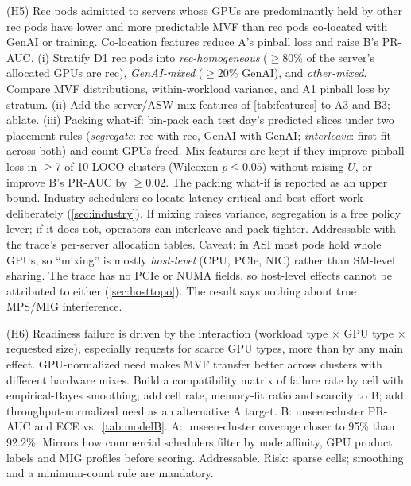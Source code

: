 {(H5) Rec pods admitted to servers whose GPUs are predominantly held by other rec pods have lower and more predictable MVF than rec pods co-located with GenAI or training. Co-location features reduce A's pinball loss and raise B's PR-AUC.}
{(i) Stratify D1 rec pods into \emph{rec-homogeneous} ($\ge$80\% of the server's allocated GPUs are rec), \emph{GenAI-mixed} ($\ge$20\% GenAI), and \emph{other-mixed}. Compare MVF distributions, within-workload variance, and A1 pinball loss by stratum. (ii) Add the server/ASW mix features of \cref{tab:features} to A3 and B3; ablate. (iii) Packing what-if: bin-pack each test day's predicted slices under two placement rules (\emph{segregate}: rec with rec, GenAI with GenAI; \emph{interleave}: first-fit across both) and count GPUs freed.}
{Mix features are kept if they improve pinball loss in $\ge$7 of 10 LOCO clusters (Wilcoxon $p\le0.05$) without raising $U$, or improve B's PR-AUC by $\ge$0.02. The packing what-if is reported as an upper bound.}
{Industry schedulers co-locate latency-critical and best-effort work deliberately (\cref{sec:industry}). If mixing raises variance, segregation is a free policy lever; if it does not, operators can interleave and pack tighter.}
{Addressable with the trace's per-server allocation tables. Caveat: in ASI most pods hold whole GPUs, so ``mixing'' is mostly \emph{host-level} (CPU, PCIe, NIC) rather than SM-level sharing. The trace has no PCIe or NUMA fields, so host-level effects cannot be attributed to either (\cref{sec:hosttopo}). The result says nothing about true MPS/MIG interference.}

{(H6) Readiness failure is driven by the interaction (workload type $\times$ GPU type $\times$ requested size), especially requests for scarce GPU types, more than by any main effect. GPU-normalized need makes MVF transfer better across clusters with different hardware mixes.}
{Build a compatibility matrix of failure rate by cell with empirical-Bayes smoothing; add cell rate, memory-fit ratio and scarcity to B; add throughput-normalized need as an alternative A target.}
{B: unseen-cluster PR-AUC and ECE vs.\ \cref{tab:modelB}. A: unseen-cluster coverage closer to 95\% than 92.2\%.}
{Mirrors how commercial schedulers filter by node affinity, GPU product labels and MIG profiles before scoring.}
{Addressable. Risk: sparse cells; smoothing and a minimum-count rule are mandatory.}

